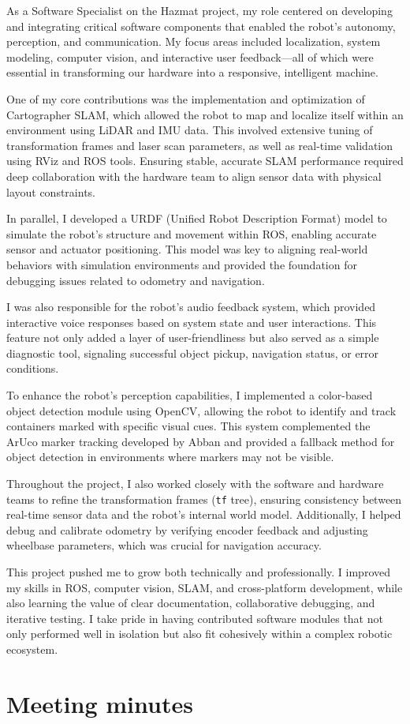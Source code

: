 \documentclass{article}
\begin{document}
\begin{appendices}
As a Software Specialist on the Hazmat project, my role centered on developing and integrating critical software components that enabled the robot's autonomy, perception, and communication. My focus areas included localization, system modeling, computer vision, and interactive user feedback---all of which were essential in transforming our hardware into a responsive, intelligent machine.

One of my core contributions was the implementation and optimization of Cartographer SLAM, which allowed the robot to map and localize itself within an environment using LiDAR and IMU data. This involved extensive tuning of transformation frames and laser scan parameters, as well as real-time validation using RViz and ROS tools. Ensuring stable, accurate SLAM performance required deep collaboration with the hardware team to align sensor data with physical layout constraints.

In parallel, I developed a URDF (Unified Robot Description Format) model to simulate the robot's structure and movement within ROS, enabling accurate sensor and actuator positioning. This model was key to aligning real-world behaviors with simulation environments and provided the foundation for debugging issues related to odometry and navigation.

I was also responsible for the robot's audio feedback system, which provided interactive voice responses based on system state and user interactions. This feature not only added a layer of user-friendliness but also served as a simple diagnostic tool, signaling successful object pickup, navigation status, or error conditions.

To enhance the robot's perception capabilities, I implemented a color-based object detection module using OpenCV, allowing the robot to identify and track containers marked with specific visual cues. This system complemented the ArUco marker tracking developed by Abban and provided a fallback method for object detection in environments where markers may not be visible.

Throughout the project, I also worked closely with the software and hardware teams to refine the transformation frames (\texttt{tf} tree), ensuring consistency between real-time sensor data and the robot's internal world model. Additionally, I helped debug and calibrate odometry by verifying encoder feedback and adjusting wheelbase parameters, which was crucial for navigation accuracy.

This project pushed me to grow both technically and professionally. I improved my skills in ROS, computer vision, SLAM, and cross-platform development, while also learning the value of clear documentation, collaborative debugging, and iterative testing. I take pride in having contributed software modules that not only performed well in isolation but also fit cohesively within a complex robotic ecosystem.
  
  \section{Meeting minutes}

  

\end{appendices}
  
\end{document}

